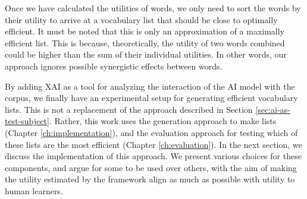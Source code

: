 Once we have calculated the utilities of words, we only need to sort the words by their utility to arrive at a vocabulary list that should be close to optimally efficient.
It must be noted that this is only an approximation of a maximally efficient list.
This is because, theoretically, the utility of two words combined could be higher than the sum of their individual utilities.
In other words, our approach ignores possible synergistic effects between words.

By adding XAI as a tool for analyzing the interaction of the AI model with the corpus, we finally have an experimental setup for generating efficient vocabulary lists.
This is not a replacement of the approach described in Section \ref{sec:ai-as-test-subject}.
Rather, this work uses the generation approach to make lists (Chapter \ref{ch:implementation}), and the evaluation approach for testing which of these lists are the most efficient (Chapter \ref{ch:evaluation}).
In the next section, we discuss the implementation of this approach.
We present various choices for these components, and argue for some to be used over others, with the aim of making the utility estimated by the framework align as much as possible with utility to human learners.

%
%

%
%


